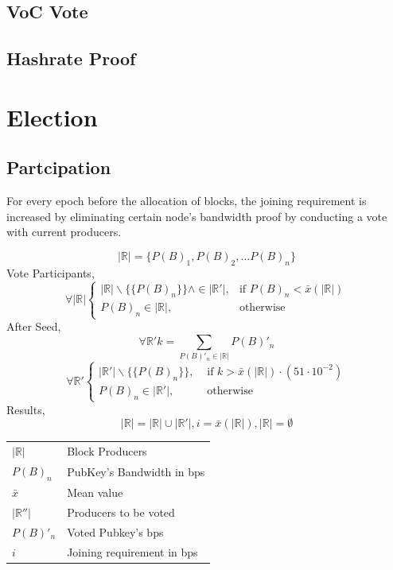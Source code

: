 \documentclass[a4paper,10pt]{article}
\makeatletter
\newenvironment{conditions}
  {\par\vspace{\abovedisplayskip}\noindent\begin{tabular}{>{$}l<{$} @{${}={}$} l}}
  {\end{tabular}\par\vspace{\belowdisplayskip}}
\makeatother
\begin{document}
\subsection{VoC Vote}
\subsection{Hashrate Proof}
\section{Election}

\subsection{Partcipation}

For every epoch before the allocation of blocks, the joining  requirement is increased by eliminating certain node's bandwidth proof by conducting a vote with current producers.

\begin{equation*}
|\mathbb{R}| = \{P(B)_1,P(B)_2,...P(B)_n\} 
\end{equation*}
Vote Participants,
\begin{equation*}
\forall |\mathbb{R}| \begin{cases}
|\mathbb{R}| \backslash \{\{P(B)_n\}\} \wedge \in |\mathbb{R}'|, & \text{if } P(B)_n < \bar{x}(|\mathbb{R}|) \\
P(B)_n \in |\mathbb{R}|,  & \text{otherwise}
\end{cases}
\end{equation*}
After Seed,
\begin{equation*}
\forall \mathbb{R'} k = \sum_{P(B)'_n \in |\mathbb{R}|} P(B)'_n
\end{equation*}
\begin{equation*}
\forall \mathbb{R'} \begin{cases}
|\mathbb{R}'| \backslash \{\{P(B)_n\}\}, & \text{ if } k > \bar{x}(|\mathbb{R}|) \cdot (51 \cdot 10^{-2})\\
P(B)_n \in |\mathbb{R}'|, & \text{ otherwise}
\end{cases}
\end{equation*}
Results, 
\begin{equation*}
|\mathbb{R}| = |\mathbb{R}| {\displaystyle \cup } |\mathbb{R}'|, i = \bar{x}(|\mathbb{R}|), |\mathbb{R}|=\emptyset
\end{equation*}
\begin{conditions}
|\mathbb{R}| & Block Producers\\
P(B)_n & PubKey's Bandwidth in bps \\
\bar{x} & Mean value\\
|\mathbb{R}''| & Producers to be voted\\
P(B)'_n & Voted Pubkey's bps\\
i & Joining requirement in bps 
\end{conditions}
\end{document}
